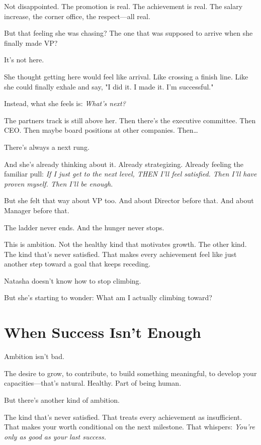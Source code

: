 \documentclass[11pt,twoside]{book}
\begin{document}
Not disappointed. The promotion is real. The achievement is real. The salary increase, the corner office, the respect—all real.

But that feeling she was chasing? The one that was supposed to arrive when she finally made VP?

It's not here.

She thought getting here would feel like arrival. Like crossing a finish line. Like she could finally exhale and say, "I did it. I made it. I'm successful."

Instead, what she feels is: \emph{What's next?}

The partners track is still above her. Then there's the executive committee. Then CEO. Then maybe board positions at other companies. Then\ldots{}

There's always a next rung.

And she's already thinking about it. Already strategizing. Already feeling the familiar pull: \emph{If I just get to the next level, THEN I'll feel satisfied. Then I'll have proven myself. Then I'll be enough.}

But she felt that way about VP too. And about Director before that. And about Manager before that.

The ladder never ends. And the hunger never stops.

This is ambition. Not the healthy kind that motivates growth. The other kind. The kind that's never satisfied. That makes every achievement feel like just another step toward a goal that keeps receding.

Natasha doesn't know how to stop climbing.

But she's starting to wonder: What am I actually climbing toward?

\section*{When Success Isn't Enough}

Ambition isn't bad.

The desire to grow, to contribute, to build something meaningful, to develop your capacities—that's natural. Healthy. Part of being human.

But there's another kind of ambition.

The kind that's never satisfied. That treats every achievement as insufficient. That makes your worth conditional on the next milestone. That whispers: \emph{You're only as good as your last success.}
\end{document}
